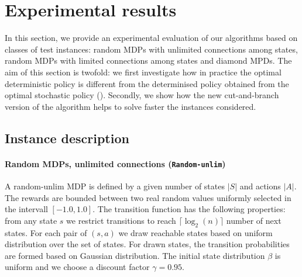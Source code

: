 \section{Experimental results}\label{sec:experiments}

In this section, we provide an experimental evaluation of our algorithms based on  classes of test instances: %
random MDPs with unlimited connections among states, random MDPs with limited connections among states and diamond MPDs.  
The aim of this section is twofold: we first investigate how in practice the optimal deterministic policy is different from the determinised policy obtained from the optimal stochastic policy ().
Secondly, we show how the new cut-and-branch version of the algorithm helps to solve faster the instances considered.




\subsection{Instance description}
\paragraph{Random MDPs, unlimited connections (\texttt{Random-unlim})}
A random-unlim MDP is defined by a given number of states $|S|$ and actions $|A|$. The rewards are bounded between two real random values uniformly selected in the intervall $[-1.0,1.0]$. 
The transition function has the following properties: from any state $s$ we restrict transitions to reach $\lceil \log_2(n) \rceil$ number of next states. 
For each pair of $(s, a)$ we draw reachable states based on uniform distribution over the set of states. For drawn states, the transition probabilities are formed based on Gaussian distribution. The initial state distribution $\beta$ is uniform and we choose a discount factor $\gamma = 0.95$. 
